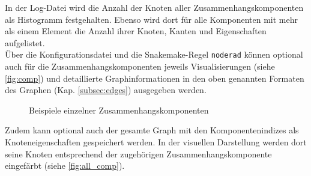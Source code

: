 In der Log-Datei wird die Anzahl der Knoten aller Zusammenhangskomponenten als Histogramm festgehalten. Ebenso wird dort für alle Komponenten mit mehr als einem Element die Anzahl ihrer Knoten, Kanten und Eigenschaften aufgelistet.\\

Über die Konfigurationsdatei und die Snakemake-Regel \lstinline|noderad| können optional auch für die Zusammenhangskomponenten jeweils Visualisierungen (siehe \autoref{fig:comp}) und detaillierte Graphinformationen in den oben genannten Formaten des Graphen (Kap. \ref{subsec:edges}) ausgegeben werden. \\

\begin{figure}[H]
	\caption{Beispiele einzelner Zusammenhangskomponenten}
	\label{fig:comp}
\end{figure}

Zudem kann optional auch der gesamte Graph mit den Komponentenindizes als Knoteneigenschaften gespeichert werden. In der visuellen Darstellung werden dort seine Knoten entsprechend der zugehörigen Zusammenhangskomponente eingefärbt (siehe \autoref{fig:all_comp}).\\

